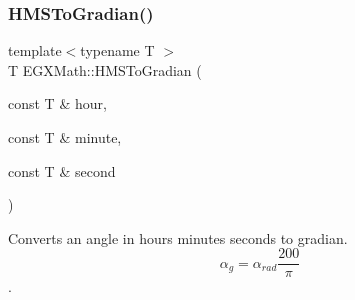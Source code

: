 \mbox{\label{group___e_g_x_math-_angle_conversions-_h_m_s_ga89aaece52b0760559444d0303bee3bf1}} 
\subsubsection{\texorpdfstring{H\+M\+S\+To\+Gradian()}{HMSToGradian()}}
{\footnotesize\ttfamily template$<$typename T $>$ \\
T E\+G\+X\+Math\+::\+H\+M\+S\+To\+Gradian (\begin{DoxyParamCaption}\item[{const T \&}]{hour,  }\item[{const T \&}]{minute,  }\item[{const T \&}]{second }\end{DoxyParamCaption})}



Converts an angle in hours minutes seconds to gradian. \[\alpha_{g}=\alpha_{rad}\frac{200}{\pi}\]. 

